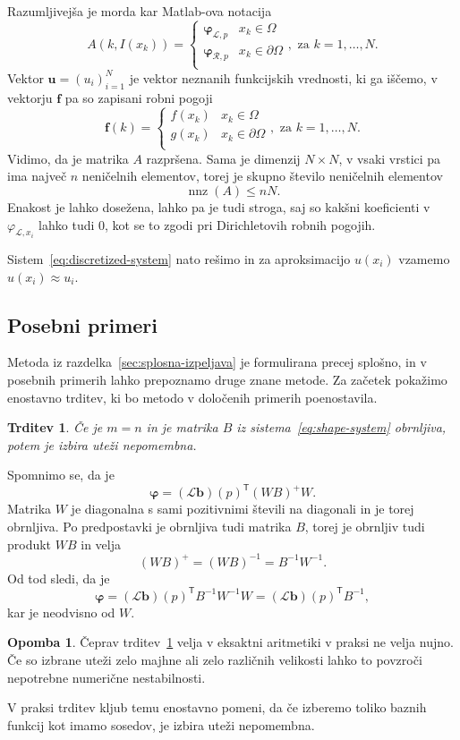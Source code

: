 \documentclass[12pt,a4paper]{article}
\theoremstyle{definition} %
\newtheorem{opomba}[definicija]{Opomba}
\theoremstyle{plain} %
\newtheorem{trditev}[definicija]{Trditev}
\numberwithin{equation}{section}
\newcommand{\Rc}{\mathcal{R}}
\renewcommand{\L}{\mathcal{L}}
\newcommand{\T}{\mathsf{T}}
\renewcommand{\b}{\boldsymbol}
\renewcommand{\phi}{\varphi}
\DeclareMathOperator{\nnz}{nnz}
\begin{document}
Razumljivejša je morda kar Matlab-ova notacija
\[
A(k, I(x_k)) = \begin{cases}
    \b\phi_{\L, p} & x_k \in \Omega \\
    \b\phi_{\Rc, p} & x_k \in \partial\Omega \\
  \end{cases}, \text{ za $k = 1, \ldots, N$}.
\]
Vektor $\b{u} = (u_i)_{i=1}^N$ je vektor neznanih funkcijskih vrednosti, ki ga
iščemo, v vektorju $\b{f}$ pa so zapisani robni pogoji
\[
  \b f(k) = \begin{cases}
    f(x_k) & x_k \in \Omega \\
    g(x_k) & x_k \in \partial\Omega \\
  \end{cases}, \text{ za $k = 1, \ldots, N$}.
\]
Vidimo, da je matrika $A$ razpršena. Sama je dimenzij $N\times N$,
v vsaki vrstici pa ima največ $n$ neničelnih
elementov, torej je skupno število neničelnih elementov
\[
  \nnz(A) \leq nN.
\]
Enakost je lahko dosežena, lahko pa je tudi stroga, saj so kakšni koeficienti v $\phi_{\L,x_i}$ lahko
tudi 0, kot se to zgodi pri Dirichletovih robnih pogojih.

Sistem~\eqref{eq:discretized-system} nato rešimo in za aproksimacijo $u(x_i)$
vzamemo $u(x_i) \approx u_i$.

\subsection{Posebni primeri}
\label{sec:posebni-primeri}
Metoda iz razdelka~\ref{sec:splosna-izpeljava} je formulirana precej splošno, in
v posebnih primerih lahko prepoznamo druge znane metode. Za začetek pokažimo
enostavno trditev, ki bo metodo v določenih primerih poenostavila.
\begin{trditev}
  \label{trd:weight-independence}
  Če je $m = n$ in je matrika $B$ iz sistema~\eqref{eq:shape-system} obrnljiva,
  potem je izbira uteži nepomembna.
\end{trditev}
\proof
Spomnimo se, da je \[
  \b\phi = (\L\b{b})(p)^\T(WB)^{+}W.
\]
Matrika $W$ je diagonalna s sami pozitivnimi števili na diagonali in je torej
obrnljiva. Po predpostavki je obrnljiva tudi matrika $B$, torej je obrnljiv tudi
produkt $WB$ in velja
\[
  (WB)^+ = (WB)^{-1} = B^{-1}W^{-1}.
\]
Od tod sledi, da je
\[
  \b\phi = (\L\b{b})(p)^\T B^{-1} W^{-1} W = (\L\b{b})(p)^\T B^{-1},
\]
kar je neodvisno od $W$.
\endproof
\begin{opomba}
  Čeprav trditev~\ref{trd:weight-independence} velja v eksaktni aritmetiki v
  praksi ne velja nujno. Če so izbrane uteži zelo majhne ali zelo različnih
  velikosti lahko to povzroči nepotrebne numerične nestabilnosti.

  V praksi trditev kljub temu enostavno pomeni, da če izberemo toliko baznih
  funkcij kot imamo sosedov, je izbira uteži nepomembna.
\end{opomba}
\end{document}
